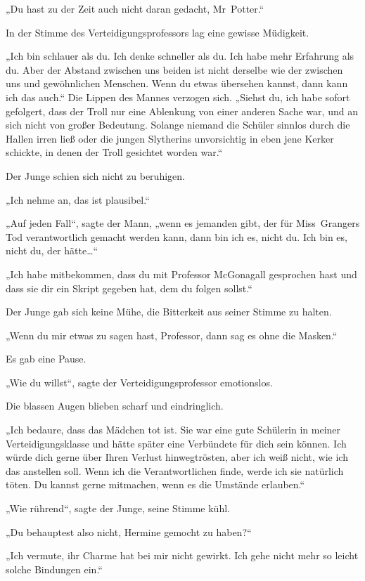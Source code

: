 {„Du hast zu der Zeit auch nicht daran gedacht, Mr~Potter.“

In der Stimme des Verteidigungsprofessors lag eine gewisse Müdigkeit.

„Ich bin schlauer als du. Ich denke schneller als du. Ich habe mehr Erfahrung als du. Aber der Abstand zwischen uns beiden ist nicht derselbe wie der zwischen uns und gewöhnlichen Menschen. Wenn du etwas übersehen kannst, dann kann ich das auch.“ Die Lippen des Mannes verzogen sich. „Siehst du, ich habe sofort gefolgert, dass der Troll nur eine Ablenkung von einer anderen Sache war, und an sich nicht von großer Bedeutung. Solange niemand die Schüler sinnlos durch die Hallen irren ließ oder die jungen Slytherins unvorsichtig in eben jene Kerker schickte, in denen der Troll gesichtet worden war.“

Der Junge schien sich nicht zu beruhigen.

„Ich nehme an, das ist plausibel.“

„Auf jeden Fall“, sagte der Mann, „wenn es jemanden gibt, der für Miss~Grangers Tod verantwortlich gemacht werden kann, dann bin ich es, nicht du. Ich bin es, nicht du, der hätte…“

„Ich habe mitbekommen, dass du mit Professor McGonagall gesprochen hast und dass sie dir ein Skript gegeben hat, dem du folgen sollst.“

Der Junge gab sich keine Mühe, die Bitterkeit aus seiner Stimme zu halten.

„Wenn du mir etwas zu sagen hast, Professor, dann sag es ohne die Masken.“

Es gab eine Pause.

„Wie du willst“, sagte der Verteidigungsprofessor emotionslos.

Die blassen Augen blieben scharf und eindringlich.

„Ich bedaure, dass das Mädchen tot ist. Sie war eine gute Schülerin in meiner Verteidigungsklasse und hätte später eine Verbündete für dich sein können. Ich würde dich gerne über Ihren Verlust hinwegtrösten, aber ich weiß nicht, wie ich das anstellen soll. Wenn ich die Verantwortlichen finde, werde ich sie natürlich töten. Du kannst gerne mitmachen, wenn es die Umstände erlauben.“

„Wie rührend“, sagte der Junge, seine Stimme kühl.

„Du behauptest also nicht, Hermine gemocht zu haben?“

„Ich vermute, ihr Charme hat bei mir nicht gewirkt. Ich gehe nicht mehr so leicht solche Bindungen ein.“

}

